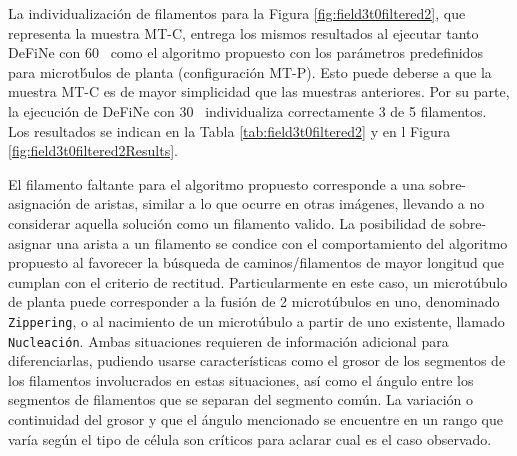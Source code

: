 La individualizaci\'on de filamentos para la Figura \ref{fig:field3t0filtered2}, que representa la muestra MT-C, entrega los mismos resultados al ejecutar tanto DeFiNe con 60\textdegree~ como el algoritmo propuesto con los par\'ametros predefinidos para microt\'bulos de planta (configuraci\'on MT-P). Esto puede deberse a que la muestra MT-C es de mayor simplicidad que las muestras anteriores. Por su parte, la ejecuci\'on de DeFiNe con 30\textdegree~ individualiza correctamente 3 de 5 filamentos. Los resultados se indican en la Tabla \ref{tab:field3t0filtered2} y en l Figura \ref{fig:field3t0filtered2Results}.



El filamento faltante para el algoritmo propuesto corresponde a una sobre-asignaci\'on de aristas, similar a lo que ocurre en otras im\'agenes, llevando a no considerar aquella soluci\'on como un filamento valido. La posibilidad de sobre-asignar una arista a un filamento se condice con el comportamiento del algoritmo propuesto al favorecer la b\'usqueda de caminos/filamentos de mayor longitud que cumplan con el criterio de rectitud. Particularmente en este caso, un microt\'ubulo de planta puede corresponder a la fusi\'on de 2 microt\'ubulos en uno, denominado {\tt Zippering}, o al nacimiento de un microt\'ubulo a partir de uno existente, llamado {\tt Nucleaci\'on}. Ambas situaciones requieren de informaci\'on adicional para diferenciarlas, pudiendo usarse caracter\'isticas como el grosor de los segmentos de los filamentos involucrados en estas situaciones, as\'i como el \'angulo entre los segmentos de filamentos que se separan del segmento com\'un. La variaci\'on o continuidad del grosor y que el \'angulo mencionado se encuentre en un rango que var\'ia seg\'un el tipo de c\'elula son cr\'iticos para aclarar cual es el caso observado. 



